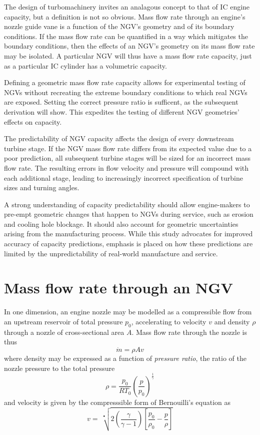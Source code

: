 \documentclass[11pt, twoside]{report}
\begin{document}
The design of turbomachinery invites an analagous concept to that of IC engine capacity, but a definition is not so obvious. Mass flow rate through an engine's nozzle guide vane is a function of the NGV's geometry and of its boundary conditions. If the mass flow rate can be quantified in a way which mitigates the boundary conditions, then the effects of an NGV's geometry on its mass flow rate may be isolated. A particular NGV will thus have a mass flow rate capacity, just as a particular IC cylinder has a volumetric capacity.

Defining a geometric mass flow rate capacity allows for experimental testing of NGVs without recreating the extreme boundary conditions to which real NGVs are exposed. Setting the correct pressure ratio is sufficent, as the subsequent derivation will show. This expedites the testing of different NGV geometries' effects on capacity.

The predictability of NGV capacity affects the design of every downstream turbine stage. If the NGV mass flow rate differs from its expected value due to a poor prediction, all subsequent turbine stages will be sized for an incorrect mass flow rate. The resulting errors in flow velocity and pressure will compound with each additional stage, leading to increasingly incorrect specification of turbine sizes and turning angles.

A strong understanding of capacity predictability should allow engine-makers to pre-empt geometric changes that happen to NGVs during service, such as erosion and cooling hole blockage. It should also account for geometric uncertainties arising from the manufacturing process. While this study advocates for improved accuracy of capacity predictions, emphasis is placed on how these predictions are limited by the unpredictability of real-world manufacture and service.


\section{Mass flow rate through an NGV}

In one dimension, an engine nozzle may be modelled as a compressible flow from an upstream reservoir of total pressure $p_0$, accelerating to velocity $v$ and density $\rho$ through a nozzle of cross-sectional area $A$. Mass flow rate through the nozzle is thus
\begin{equation}
\dot{m} = \rho A v
\end{equation}
where density may be expressed as a function of \textit{pressure ratio}, the ratio of the nozzle pressure to the total pressure
\begin{equation}
\rho = \frac{p_0}{R T_0} \left(\frac{p}{p_0}\right)^\frac{1}{\gamma}
\end{equation}
and velocity is given by the compresssible form of Bernouilli's equation as
\begin{equation}
v = \>
\sqrt[•]{ 
	2 \left( \frac{\gamma}{\gamma - 1} \right) \left[ \frac{p_0}{\rho_0} - \frac{p}{\rho} \right] 
}
\end{equation}
\end{document}
